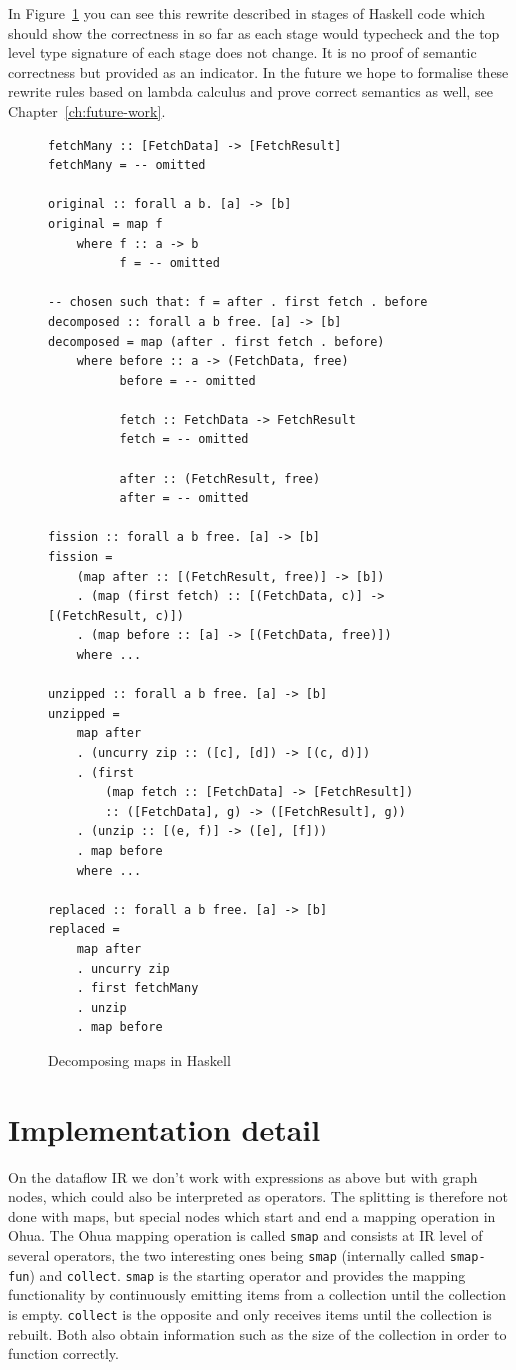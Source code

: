In Figure~\ref{fig:map-decomposition-in-code} you can see this rewrite described in stages of Haskell code which should show the correctness in so far as each stage would typecheck and the top level type signature of each stage does not change.
It is no proof of semantic correctness but provided as an indicator.
In the future we hope to formalise these rewrite rules based on lambda calculus and prove correct semantics as well, see Chapter~\ref{ch:future-work}.

\begin{figure}
\begin{verbatim}
fetchMany :: [FetchData] -> [FetchResult]
fetchMany = -- omitted

original :: forall a b. [a] -> [b]
original = map f
    where f :: a -> b
          f = -- omitted

-- chosen such that: f = after . first fetch . before
decomposed :: forall a b free. [a] -> [b]
decomposed = map (after . first fetch . before)
    where before :: a -> (FetchData, free)
          before = -- omitted

          fetch :: FetchData -> FetchResult
          fetch = -- omitted

          after :: (FetchResult, free)
          after = -- omitted

fission :: forall a b free. [a] -> [b]
fission =
    (map after :: [(FetchResult, free)] -> [b])
    . (map (first fetch) :: [(FetchData, c)] -> [(FetchResult, c)])
    . (map before :: [a] -> [(FetchData, free)])
    where ...

unzipped :: forall a b free. [a] -> [b]
unzipped =
    map after
    . (uncurry zip :: ([c], [d]) -> [(c, d)])
    . (first
        (map fetch :: [FetchData] -> [FetchResult])
        :: ([FetchData], g) -> ([FetchResult], g))
    . (unzip :: [(e, f)] -> ([e], [f]))
    . map before
    where ...

replaced :: forall a b free. [a] -> [b]
replaced =
    map after
    . uncurry zip
    . first fetchMany
    . unzip
    . map before
\end{verbatim}
\caption{Decomposing maps in Haskell}
\label{fig:map-decomposition-in-code}
\end{figure}


\section{Implementation detail}

On the dataflow IR we don't work with expressions as above but with graph nodes, which could also be interpreted as operators.
The splitting is therefore not done with maps, but special nodes which start and end a mapping operation in Ohua.
The Ohua mapping operation is called \texttt{smap} and consists at IR level of several operators, the two interesting ones being \texttt{smap} (internally called \texttt{smap-fun}) and \texttt{collect}.
\texttt{smap} is the starting operator and provides the mapping functionality by continuously emitting items from a collection until the collection is empty.
\texttt{collect} is the opposite and only receives items until the collection is rebuilt.
Both also obtain information such as the size of the collection in order to function correctly.

